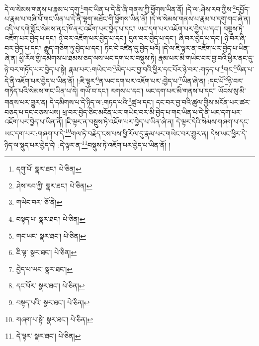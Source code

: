 དེ་ལ་སེམས་གནས་པ་རྣམ་པ་དགུ་\footnote{དགུ་པོ་  སྣར་ཐང་།  པེ་ཅིན། }གང་ཡིན་པ་དེ་ནི་ཞི་གནས་ཀྱི་ཕྱོགས་ཡིན་ནོ། །དེ་ལ་:ཤེས་རབ་ཀྱིས་\footnote{ཤེས་རབ་ཀྱི་  སྣར་ཐང་།  པེ་ཅིན། }དཔྱོད་པ་རྣམ་པ་བཞི་པོ་གང་ཡིན་པ་དེ་ནི་ལྷག་མཐོང་གི་ཕྱོགས་ཡིན་ནོ། །དེ་ལ་སེམས་གནས་པ་རྣམ་པ་དགུ་གང་ཞེ་ན། འདི་ལ་དགེ་སློང་སེམས་ནང་ཁོ་ནར་འཇོག་པར་བྱེད་པ་དང་། ཡང་དག་པར་འཇོག་པར་བྱེད་པ་དང་། བསྡུས་ཏེ་འཇོག་པར་བྱེད་པ་དང་། ཉེ་བར་འཇོག་པར་བྱེད་པ་དང་། དུལ་བར་བྱེད་པ་དང་། ཞི་བར་བྱེད་པ་དང་། ཉེ་བར་ཞི་བར་བྱེད་པ་དང་། རྒྱུད་གཅིག་ཏུ་བྱེད་པ་དང་། ཏིང་ངེ་འཛིན་དུ་བྱེད་པའོ། །དེ་ལ་ཇི་ལྟར་ན་འཇོག་པར་བྱེད་པ་ཡིན་ཞེ་ན། ཕྱི་རོལ་གྱི་དམིགས་པ་ཐམས་ཅད་ལས་ཡང་དག་པར་བསྡུས་ཏེ། རྣམ་པར་མི་གཡེང་བར་བྱ་བའི་ཕྱིར་ནང་དུ་ཉེ་བར་གཏོད་པར་བྱེད་པ་སྟེ། རྣམ་པར་:གཡེང་བ་\footnote{གཡེང་བར་  ཅོ་ནེ། }མེད་པར་བྱ་བའི་ཕྱིར་དང་པོར་ཉེ་བར་:གཏད་པ་\footnote{བསྟད་པ་  སྣར་ཐང་།  པེ་ཅིན། }གང་\footnote{གང་ཡང་  སྣར་ཐང་།  པེ་ཅིན། }ཡིན་པ་དེ་ནི་འཇོག་པར་བྱེད་པ་ཡིན་ནོ། །:ཇི་ལྟར་\footnote{ཇི་ལྟ་  སྣར་ཐང་།  པེ་ཅིན། }ན་ཡང་དག་པར་འཇོག་པར་:བྱེད་པ་\footnote{བྱེད་པ་ཡང་  སྣར་ཐང་། }ཡིན་ཞེ་ན། :དང་པོ་\footnote{དང་པོར་  སྣར་ཐང་།  པེ་ཅིན། }ཉེ་བར་གཏོད་པའི་སེམས་གང་ཡིན་པ་དེ། གཡོ་བ་དང་། རགས་པ་དང་། ཡང་དག་པར་མི་གནས་པ་དང་། ཡོངས་སུ་མི་གནས་པར་གྱུར་ན། དེ་དམིགས་པ་དེ་ཉིད་ལ་:གཏད་པའི་\footnote{བསྟད་པའི་  སྣར་ཐང་།  པེ་ཅིན། }ཚུལ་དང་། དང་བར་བྱ་བའི་ཚུལ་གྱིས་མངོན་པར་ཚར་བཅད་པ་དང་བཅས་པས། ཕྲ་བར་བྱེད་ཅིང་མངོན་པར་གཡེང་བར་མི་བྱེད་པ་གང་ཡིན་པ་དེ་ནི་ཡང་དག་པར་འཇོག་པར་བྱེད་པ་ཡིན་ནོ། །ཇི་ལྟར་ན་བསྡུས་ཏེ་འཇོག་པར་བྱེད་པ་ཡིན་ཞེ་ན། དེ་ལྟར་དེའི་སེམས་གཞག་པ་དང་ཡང་དག་པར་:གཞག་པ་དེ་\footnote{གཞག་པ་སྟེ་  སྣར་ཐང་།  པེ་ཅིན། }གལ་ཏེ་བརྗེད་ངས་པས་ཕྱི་རོལ་དུ་རྣམ་པར་གཡེང་བར་གྱུར་ན། དེས་ཡང་ཕྱིར་དེ་ཉིད་ལ་སྡུད་པར་བྱེད་དེ། :དེ་ལྟར་ན་\footnote{དེ་ལྟར་  སྣར་ཐང་།  པེ་ཅིན། }བསྡུས་ཏེ་འཇོག་པར་བྱེད་པ་ཡིན་ནོ། །
